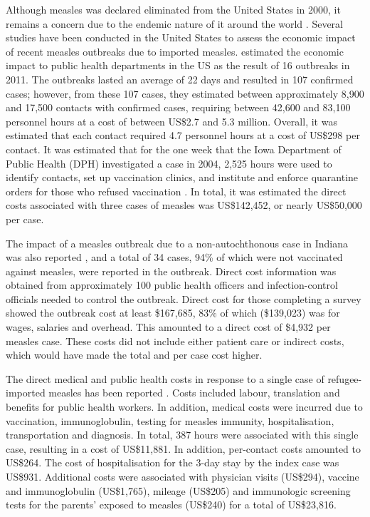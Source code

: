 \documentclass{article}
\begin{document}
Although measles was declared eliminated from the United States in 2000, it remains a concern due to the endemic nature of it around the world \citep{parker6}. Several studies have been conducted in the United States to assess the economic impact of recent measles outbreaks due to imported measles.  \citep{ortegasanchez14} estimated the economic impact to public health departments in the US as the result of 16 outbreaks in 2011. The outbreaks lasted an average of 22 days and resulted in 107 confirmed cases; however, from these 107 cases, they estimated between approximately 8,900 and 17,500 contacts with confirmed cases, requiring between 42,600 and 83,100 personnel hours at a cost of between US\$2.7 and 5.3 million. Overall, it was estimated that each contact required 4.7 personnel hours at a cost of US\$298 per contact.
It was estimated that for the one week that the Iowa Department of Public Health (DPH) investigated a case in 2004, 2,525 hours were used to identify contacts, set up vaccination clinics, and institute and enforce quarantine orders for those who refused vaccination \citep{dayan5}. In total, it was estimated the direct costs associated with three cases of measles was US\$142,452, or nearly US\$50,000 per case.

The impact of a measles outbreak due to a non-autochthonous case in Indiana was also reported \citep{parker6}, and a total of 34 cases, 94\% of which were not vaccinated against measles, were reported in the outbreak. Direct cost information was obtained from approximately 100 public health officers and infection-control officials needed to control the outbreak. Direct cost for those completing a survey showed the outbreak cost at least \$167,685, 83\% of which (\$139,023) was for wages, salaries and overhead. This amounted to a direct cost of \$4,932 per measles case. These costs did not include either patient care or indirect costs, which would have made the total and per case cost higher.

The direct medical and public health costs in response to a single case of refugee-imported measles has been reported \citep{coleman12}.  Costs included labour, translation and benefits for public health workers. In addition, medical costs were incurred due to vaccination, immunoglobulin, testing for measles immunity, hospitalisation, transportation and diagnosis. In total, 387 hours were associated with this single case, resulting in a cost of US\$11,881. In addition, per-contact costs amounted to US\$264. The cost of hospitalisation for the 3-day stay by the index case was US\$931. Additional costs were associated with physician visits (US\$294), vaccine and immunoglobulin (US\$1,765), mileage (US\$205) and immunologic screening tests for the parents' exposed to measles (US\$240) for a total of US\$23,816.
\end{document}
